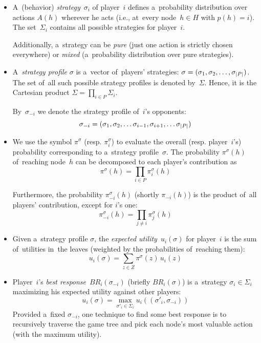 \begin{itemize}
  \item A~(behavior) \emph{strategy}~$\sigma_i$ of player~$i$ defines a~probability distribution over actions $A(h)$ wherever he acts (i.e., at~every node~$h \in H$ with $p(h) = i$).
    The set~$\Sigma_i$ contains all possible strategies for player~$i$.

  Additionally, a~strategy can be \emph{pure} (just one action is strictly chosen everywhere) or \emph{mixed} (a~probability distribution over pure strategies).

  \item A~\emph{strategy profile} $\sigma$ is a~vector of~players' strategies:
    $\sigma = (\sigma_1, \sigma_2, \ldots, \sigma_ {\left|{P}\right|})$.
    The set of~all such possible strategy profiles is denoted by~$\Sigma$.
    Hence, it is the Cartesian product $\Sigma = \prod_{i \in P} \Sigma_i$.

    By~$\sigma_{-i}$ we denote the strategy profile of~$i$'s opponents:
    \[ \sigma_{-i} = (\sigma_1, \sigma_2, \ldots \sigma_{i-1}, \sigma_{i+1}, \ldots \sigma_ {\left|{P}\right|}) \]

  \item We use the symbol $\pi^\sigma$ (resp. $\pi_i^\sigma$) to evaluate the overall (resp. player~$i$'s) probability corresponding to a~strategy profile~$\sigma$.
    The probability $\pi^\sigma(h)$ of~reaching node~$h$ can be decomposed to each player's contribution as
    \[ \pi ^\sigma(h) = \prod _{i \in P} \pi _i ^\sigma (h) \]

    Furthermore, the probability $\pi _{-i} ^\sigma (h)$ (shortly $\pi _{-i} (h)$) is the product of~all players' contribution, except for $i$'s one:
    \[ \pi _{-i} ^\sigma(h) = \prod _{j \ne i} \pi _j ^\sigma (h) \]
    
  \item Given a~strategy profile $\sigma$, the \emph{expected utility}~$u_i (\sigma)$ for player~$i$
    is the sum of~utilities in~the leaves (weighted by the probabilities of~reaching them):
    \[ u_i (\sigma) = \sum _{z \in Z} \pi^\sigma\!(z) \,u_i(z)\]

  \item Player~$i$'s \emph{best response}~$BR _i (\sigma _{-i})$ (briefly $BR _i (\sigma)$) is a~strategy $\sigma _i \in \Sigma _i$ maximizing his expected utility against other players:
    \[ u_i (\sigma) = \max _{\sigma'_i \in \Sigma_i} u_i ((\sigma'_i, \sigma_{-i})) \]
    Provided a~fixed $\sigma_{-i}$, one technique to find some best response is to recursively traverse the game tree and pick each node's most valuable action (with the maximum utility).
\end{itemize}


